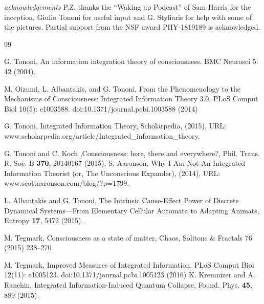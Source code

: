 \documentclass[aps,pra,groupaddress]{revtex4-1}
\begin{document}
\emph{acknowledgements} P.Z. thanks the ``Waking up Podcast'' of Sam Harris for the inception, Giulio Tononi for useful input and  G. Styliaris for help with some of the pictures.
 Partial support from the NSF award PHY-1819189 is acknowledged. 
 

\begin{thebibliography}{99}

 G. Tononi, An information integration theory of consciousness. BMC Neurosci 5: 42 (2004).

 M. Oizumi, L. Albantakis, and G. Tononi, From the Phenomenology to the Mechanisms of Consciousness: Integrated Information Theory 3.0, PLoS
Comput Biol 10(5): e1003588. doi:10.1371/journal.pcbi.1003588 (2014)

 G. Tononi, Integrated Information Theory,
  Scholarpedia, (2015), URL: {\scriptsize www.scholarpedia.org/article/Integrated\_information\_theory}.

 G. Tononi and C. Koch ,Consciousness: here, there and everywhere?, Phil. Trans. R. Soc. B {\bf 370}, 20140167 (2015).
 S. Aaronson, Why I Am Not An Integrated Information
  Theorist (or, The Unconscious Expander), (2014), URL:
{{www.scottaaronson.com/blog/?p=1799}}.


 L. Albantakis and G. Tononi, The Intrinsic Cause-Effect Power of Discrete Dynamical Systems—From Elementary Cellular Automata to Adapting Animats,
Entropy {\bf 17}, 5472 (2015).

 M. Tegmark, Consciousness as a state of matter, Chaos, Solitons \& Fractals 76 (2015) 238–270


 M. Tegmark, Improved Measures of Integrated Information. PLoS Comput Biol 12(11): e1005123. doi:10.1371/journal.pcbi.1005123 (2016)
K. Kremnizer and A. Ranchin, Integrated Information-Induced Quantum Collapse, Found. Phys. {\bf 45}, 889 (2015).



\end{thebibliography}
\end{document}

